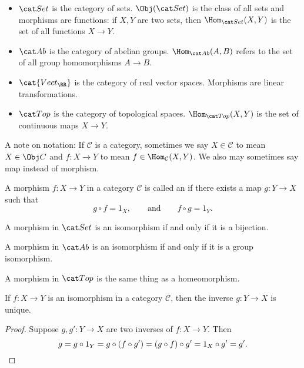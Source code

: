 \documentclass{standalone}
\begin{document}
\begin{example}
  \begin{itemize}[nosep]
    \item \(\cSet\) is the category of sets.
    \(\Obj(\cSet)\) is the class of all sets and morphisms are functions:
    if \(X, Y\) are two sets, then \(\Hom_{\cSet}(X, Y)\) is
    the set of all functions \(X \to Y\).

    \item \(\cAb\) is the category of abelian groups.
    \(\Hom_{\cAb}(A, B)\) refers to the set of all group homomorphisms
    \(A \to B\).

    \item \(\cat{Vect_\RR}\) is the category of real vector spaces.
    Morphisms are linear transformations.

    \item \(\cTop\) is the category of topological spaces.
    \(\Hom_{\cTop}(X, Y)\) is the set of continuous maps \(X \to Y\).
  \end{itemize}
\end{example}

A note on notation: If \(\mathcal C\) is a category, sometimes we say
\(X \in \mathcal C\) to mean \(X \in \Obj C\) and
\(f \colon X \to Y\) to mean \(f \in \Hom_{\mathcal C}(X, Y)\).
We also may sometimes say map instead of morphism.

\begin{definition}
  A morphism \(f \colon X \to Y\) in a category \(\mathcal C\) is called an
   if there exists a map \(g \colon Y \to X\) such that
  \[
    g \circ f = 1_X, \qquad \text{and} \qquad f \circ g = 1_Y.
  \]
\end{definition}

\begin{example}
  A morphism in \(\cSet\) is an isomorphism if and only if
  it is a bijection.

  A morphism in \(\cAb\) is an isomorphism if and only if
  it is a group isomorphism.

  A morphism in \(\cTop\) is the same thing as a homeomorphism.
\end{example}

\begin{proposition}
  If \(f \colon X \to Y\) is an isomorphism in a category \(\mathcal C\),
  then the inverse \(g \colon Y \to X\) is unique.
\end{proposition}
\begin{proof}
  Suppose \(g, g' \colon Y \to X\) are two inverses of \(f \colon X \to Y\).
  Then
  \[
    g = g \circ 1_Y = g \circ (f \circ g') =
    (g \circ f) \circ g' = 1_X \circ g' = g'. \qedhere
  \]
\end{proof}
\end{document}
